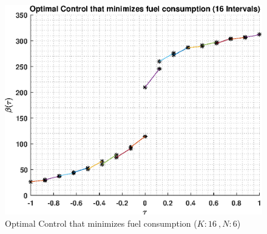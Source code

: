 \documentclass[]{article}
\begin{document}
\begin{figure}
	\centering
	\includegraphics[scale=0.75]{directControlK16Poly6.eps}
	\caption{Optimal Control that minimizes fuel consumption (\(K:16\ , N:6\))}
	\label{fig:directControlK16Poly6}
\end{figure}
\end{document}
